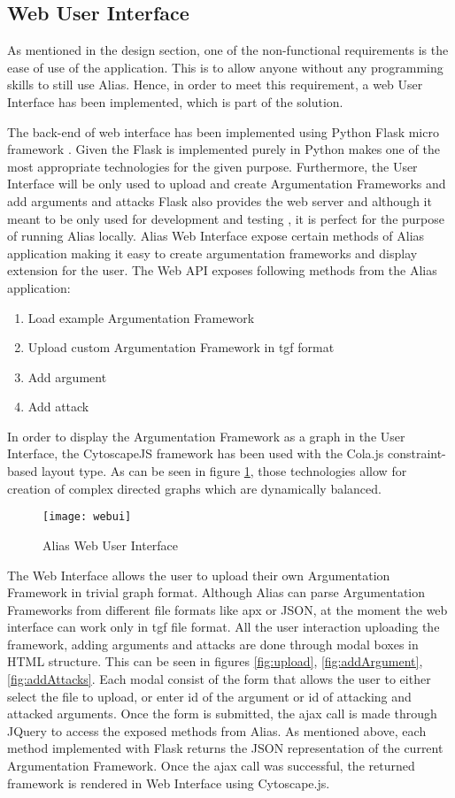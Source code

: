 \subsection{Web User Interface}
As mentioned in the design section, one of the non-functional requirements is the ease of use of the application. This is to allow anyone without any programming skills to still use Alias. Hence, in order to meet this requirement, a web User Interface has been implemented, which is part of the solution.

The back-end of web interface has been implemented using Python Flask micro framework \citep{flaskDocs}. Given the Flask is implemented purely in Python makes one of the most appropriate technologies for the given purpose. Furthermore, the User Interface will be only used to upload and create Argumentation Frameworks and add arguments and attacks Flask also provides the web server and although it meant to be only used for development and testing \citep{flaskBook}, it is perfect for the purpose of running Alias locally. Alias Web Interface expose certain methods of Alias application making it easy to create argumentation frameworks and display extension for the user. The Web API exposes following methods from the Alias application:
\begin{enumerate}
	\item Load example Argumentation Framework
	\item Upload custom Argumentation Framework in tgf format
	\item Add argument
	\item Add attack
\end{enumerate}

In order to display the Argumentation Framework as a graph in the User Interface, the CytoscapeJS \citep{cytoscapejs} framework has been used with the Cola.js constraint-based layout type. As can be seen in figure \ref{fig:webUi}, those technologies allow for creation of complex directed graphs which are dynamically balanced.

\begin{figure}
	\texttt{[image: webui]}
	\caption{Alias Web User Interface}
	\label{fig:webUi}
\end{figure}

The Web Interface allows the user to upload their own Argumentation Framework in trivial graph format. Although Alias can parse Argumentation Frameworks from different file formats like apx or JSON, at the moment the web interface can work only in tgf file format. All the user interaction uploading the framework, adding arguments and attacks are done through modal boxes in HTML structure. This can be seen in figures \ref{fig:upload}, \ref{fig:addArgument}, \ref{fig:addAttacks}. Each modal consist of the form that allows the user to either select the file to upload, or enter id of the argument or id of attacking and attacked arguments. Once the form is submitted, the ajax call is made through JQuery to access the exposed methods from Alias. As mentioned above, each method implemented with Flask returns the JSON representation of the current Argumentation Framework. Once the ajax call was successful, the returned framework is rendered in Web Interface using Cytoscape.js.

